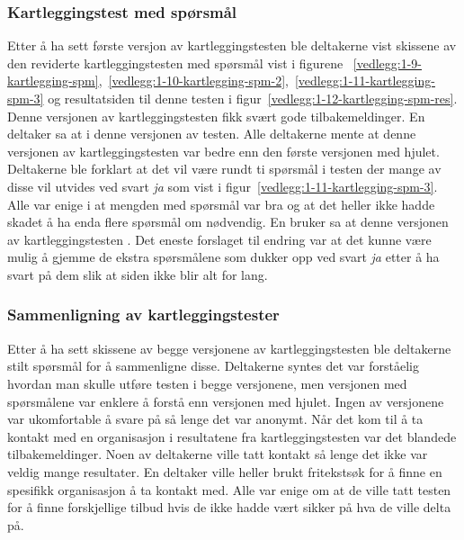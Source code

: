 \subsubsection{Kartleggingstest med spørsmål}
\label{section:test-kartlegging-spm1.0}

Etter å ha sett første versjon av kartleggingstesten ble deltakerne vist skissene av den reviderte kartleggingstesten med spørsmål vist i figurene ~\ref{vedlegg:1-9-kartlegging-spm},~\ref{vedlegg:1-10-kartlegging-spm-2},~\ref{vedlegg:1-11-kartlegging-spm-3} og resultatsiden til denne testen i figur~\ref{vedlegg:1-12-kartlegging-spm-res}. Denne versjonen av kartleggingstesten fikk svært gode tilbakemeldinger. En deltaker sa at  i denne versjonen av testen. Alle deltakerne mente at denne versjonen av kartleggingstesten var bedre enn den første versjonen med hjulet. Deltakerne ble forklart at det vil være rundt ti spørsmål i testen der mange av disse vil utvides ved svart {\em  ja} som vist i figur~\ref{vedlegg:1-11-kartlegging-spm-3}. Alle var enige i at mengden med spørsmål var bra og at det heller ikke hadde skadet å ha enda flere spørsmål om nødvendig. En bruker sa at denne versjonen av kartleggingstesten . Det eneste forslaget til endring var at det kunne være mulig å gjemme de ekstra spørsmålene som dukker opp ved svart {\em  ja} etter å ha svart på dem slik at siden ikke blir alt for lang.


\subsubsection{Sammenligning av kartleggingstester}

Etter å ha sett skissene av begge versjonene av kartleggingstesten ble deltakerne stilt spørsmål for å sammenligne disse. Deltakerne syntes det var forståelig hvordan man skulle utføre testen i begge versjonene, men versjonen med spørsmålene var enklere å forstå enn versjonen med hjulet. Ingen av versjonene var ukomfortable å svare på så lenge det var anonymt. Når det kom til å ta kontakt med en organisasjon i resultatene fra kartleggingstesten var det blandede tilbakemeldinger. Noen av deltakerne ville tatt kontakt så lenge det ikke var veldig mange resultater. En deltaker ville heller brukt fritekstsøk for å finne en spesifikk organisasjon å ta kontakt med. Alle var enige om at de ville tatt testen for å finne forskjellige tilbud hvis de ikke hadde vært sikker på hva de ville delta på.

